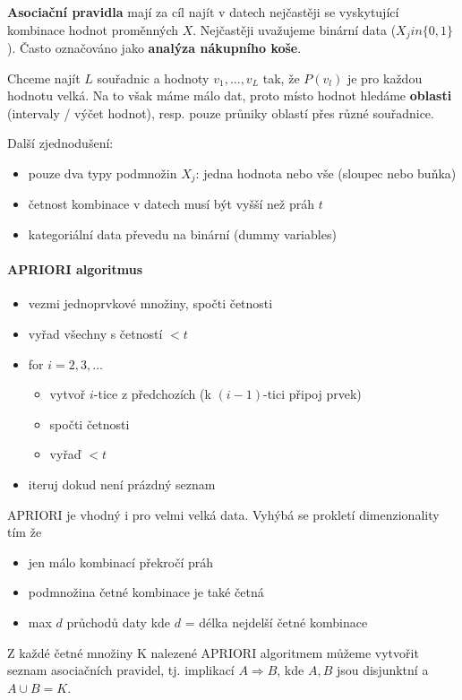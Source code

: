 \documentclass[11pt]{report} %
\numberwithin{equation}{section}
\begin{document}
\textbf{Asociační pravidla} mají za cíl najít v datech nejčastěji se vyskytující kombinace hodnot proměnných $X$. Nejčastěji uvažujeme binární data ($X_j in \{0, 1\}$). Často označováno jako \textbf{analýza nákupního koše}. 

Chceme najít $L$ souřadnic a hodnoty $v_1, \dots, v_L$ tak, že $P(v_l)$ je pro každou hodnotu velká. Na to však máme málo dat, proto místo hodnot hledáme \textbf{oblasti} (intervaly / výčet hodnot), resp. pouze průniky oblastí přes různé souřadnice.

Další zjednodušení: 
\begin{itemize}
	\item pouze dva typy podmnožin $X_j$: jedna hodnota nebo vše (sloupec nebo buňka)
	\item četnost kombinace v datech musí být vyšší než práh $t$
	\item kategoriální data převedu na binární (dummy variables)
\end{itemize}

\paragraph{APRIORI algoritmus}
\begin{itemize}
	\item vezmi jednoprvkové množiny, spočti četnosti
	\item vyřad všechny s četností $< t$
	\item for $i = 2,3,\dots$
	\begin{itemize} 						
		\item vytvoř $i$-tice z předchozích (k $(i-1)$-tici připoj prvek)
		\item spočti četnosti
		\item vyřaď $< t$
	\end{itemize}
	\item iteruj dokud není prázdný seznam
\end{itemize}

APRIORI je vhodný i pro velmi velká data. Vyhýbá se prokletí dimenzionality tím že 
\begin{itemize}
\item jen málo kombinací překročí práh
\item podmnožina četné kombinace je také četná
\item max $d$ průchodů daty kde $d$ = délka nejdelší četné kombinace
\end{itemize}

Z každé četné množiny K nalezené APRIORI algoritmem můžeme vytvořit seznam asociačních pravidel, tj. implikací $A \Rightarrow B$, kde $A,B$ jsou disjunktní a $A \cup B = K$. 
\end{document}
